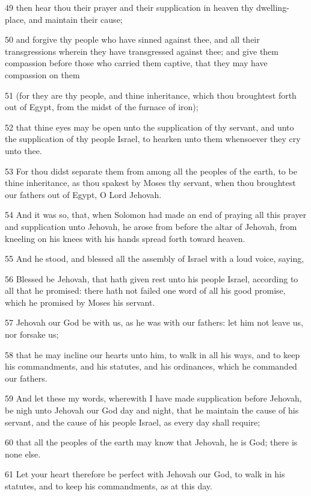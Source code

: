 \par 49 then hear thou their prayer and their supplication in heaven thy dwelling-place, and maintain their cause;
\par 50 and forgive thy people who have sinned against thee, and all their transgressions wherein they have transgressed against thee; and give them compassion before those who carried them captive, that they may have compassion on them
\par 51 (for they are thy people, and thine inheritance, which thou broughtest forth out of Egypt, from the midst of the furnace of iron);
\par 52 that thine eyes may be open unto the supplication of thy servant, and unto the supplication of thy people Israel, to hearken unto them whensoever they cry unto thee.
\par 53 For thou didst separate them from among all the peoples of the earth, to be thine inheritance, as thou spakest by Moses thy servant, when thou broughtest our fathers out of Egypt, O Lord Jehovah.
\par 54 And it was so, that, when Solomon had made an end of praying all this prayer and supplication unto Jehovah, he arose from before the altar of Jehovah, from kneeling on his knees with his hands spread forth toward heaven.
\par 55 And he stood, and blessed all the assembly of Israel with a loud voice, saying,
\par 56 Blessed be Jehovah, that hath given rest unto his people Israel, according to all that he promised: there hath not failed one word of all his good promise, which he promised by Moses his servant.
\par 57 Jehovah our God be with us, as he was with our fathers: let him not leave us, nor forsake us;
\par 58 that he may incline our hearts unto him, to walk in all his ways, and to keep his commandments, and his statutes, and his ordinances, which he commanded our fathers.
\par 59 And let these my words, wherewith I have made supplication before Jehovah, be nigh unto Jehovah our God day and night, that he maintain the cause of his servant, and the cause of his people Israel, as every day shall require;
\par 60 that all the peoples of the earth may know that Jehovah, he is God; there is none else.
\par 61 Let your heart therefore be perfect with Jehovah our God, to walk in his statutes, and to keep his commandments, as at this day.

